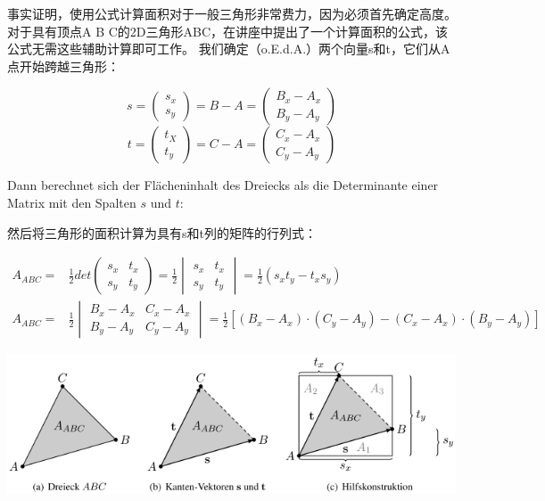 \documentclass[fleqn]{article}
\begin{document}
事实证明，使用公式计算面积对于一般三角形非常费力，因为必须首先确定高度。对于具有顶点A B C的2D三角形ABC，在讲座中提出了一个计算面积的公式，该公式无需这些辅助计算即可工作。 我们确定（o.E.d.A.）两个向量s和t，它们从A点开始跨越三角形：

$$s=\begin{pmatrix}
    s_x\\s_y
\end{pmatrix}=B-A=\begin{pmatrix}
    B_x-A_x\\B_y-A_y
\end{pmatrix}$$
$$t=\begin{pmatrix}
    t_X\\t_y
\end{pmatrix}=C-A=\begin{pmatrix}
    C_x-A_x\\C_y-A_y
\end{pmatrix}$$

Dann berechnet sich der Flächeninhalt des Dreiecks als die Determinante einer Matrix mit den Spalten $s$ und $t$:

然后将三角形的面积计算为具有s和t列的矩阵的行列式：

\begin{equation}
    \begin{aligned}
        A_{ABC} =& \frac{1}{2}det\begin{pmatrix}
            s_x & t_x\\s_y&t_y
        \end{pmatrix}=\frac{1}{2}\begin{vmatrix}
            s_x & t_x\\s_y&t_y
        \end{vmatrix}=\frac{1}{2}(s_xt_y-t_xs_y)\\
        A_{ABC} =& \frac{1}{2}\begin{vmatrix}
            B_x-A_x & C_x-A_x\\ B_y-A_y & C_y-A_y
        \end{vmatrix}=\frac{1}{2}[(B_x-A_x)\cdot(C_y-A_y)-(C_x-A_x)\cdot(B_y-A_y)]
    \end{aligned}
\end{equation}

\begin{center}
    \includegraphics[scale=0.6]{16.png}
\end{center}
\end{document}
